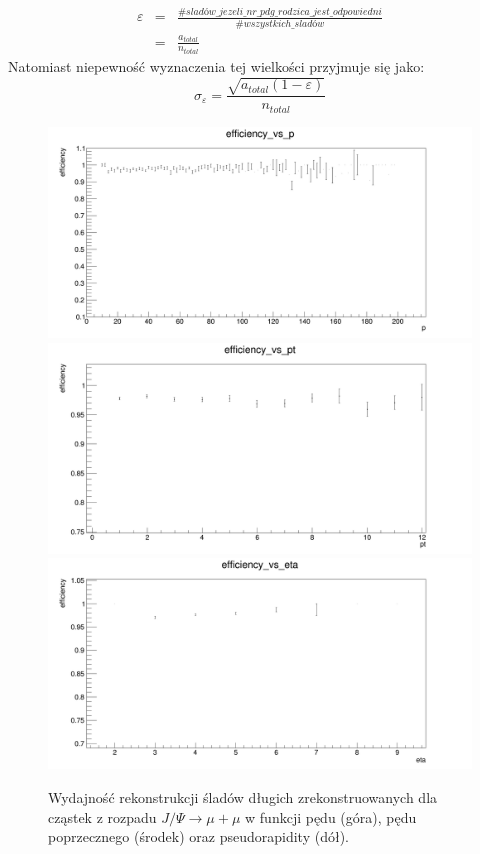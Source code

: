 \begin{eqnarray}
\varepsilon &=& \frac{\# sladów\_jezeli\_nr\_pdg\_rodzica\_jest\_odpowiedni }{\# wszystkich\_sladów} \\ \nonumber &=&\frac{a_{total}}{n_{total}}
\end{eqnarray}
Natomiast niepewność wyznaczenia tej wielkości przyjmuje się jako:
\begin{equation}
\sigma_{\varepsilon}=\frac{\sqrt{a_{total}(1-\varepsilon)}}{n_{total}}
\end{equation}

\begin{figure}[H]
\includegraphics[scale=0.25]{rozdzial6/Jpsi_p.png} \\
\includegraphics[scale=0.25]{rozdzial6/Jpsi_pt.png} \\
\includegraphics[scale=0.25]{rozdzial6/Jpsi_eta.png} \\ 
\caption{Wydajność rekonstrukcji śladów długich zrekonstruowanych dla cząstek z rozpadu $J/\Psi \rightarrow \mu + \mu $  w funkcji pędu (góra), pędu poprzecznego (środek) oraz pseudorapidity (dół).}
\label{effJPsi}
\end{figure}



